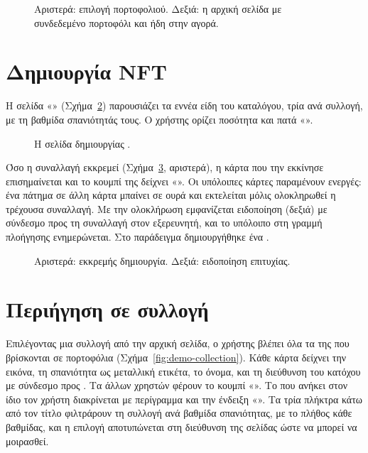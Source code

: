 \begin{figure}[H]
\centering
{}
\caption{Αριστερά: επιλογή πορτοφολιού. Δεξιά: η αρχική σελίδα με συνδεδεμένο πορτοφόλι
και  ήδη στην αγορά.}
\label{fig:demo-connect}
\end{figure}

\section{Δημιουργία NFT}
\label{sec:demo-mint}

Η σελίδα «» (Σχήμα~\ref{fig:demo-mint}) παρουσιάζει τα εννέα είδη του καταλόγου,
τρία ανά συλλογή, με τη βαθμίδα σπανιότητάς τους. Ο χρήστης ορίζει ποσότητα και πατά
«».

\begin{figure}[H]
\centering
{}
\caption{Η σελίδα δημιουργίας .}
\label{fig:demo-mint}
\end{figure}

Όσο η συναλλαγή εκκρεμεί (Σχήμα~\ref{fig:demo-mint-states}, αριστερά), η κάρτα που την
εκκίνησε επισημαίνεται και το κουμπί της δείχνει «». Οι υπόλοιπες κάρτες
παραμένουν ενεργές: ένα πάτημα σε άλλη κάρτα μπαίνει σε ουρά και εκτελείται μόλις
ολοκληρωθεί η τρέχουσα συναλλαγή. Με την ολοκλήρωση εμφανίζεται ειδοποίηση (δεξιά) με
σύνδεσμο προς τη συναλλαγή στον εξερευνητή, και το υπόλοιπο στη γραμμή πλοήγησης
ενημερώνεται. Στο παράδειγμα δημιουργήθηκε ένα .

\begin{figure}[H]
\centering
{}
\caption{Αριστερά: εκκρεμής δημιουργία. Δεξιά: ειδοποίηση επιτυχίας.}
\label{fig:demo-mint-states}
\end{figure}

\section{Περιήγηση σε συλλογή}
\label{sec:demo-collection}

Επιλέγοντας μια συλλογή από την αρχική σελίδα, ο χρήστης βλέπει όλα τα  της που
βρίσκονται σε πορτοφόλια (Σχήμα~\ref{fig:demo-collection}). Κάθε κάρτα δείχνει την εικόνα,
τη σπανιότητα ως μεταλλική ετικέτα, το όνομα, και τη διεύθυνση του κατόχου με σύνδεσμο προς
. Τα  άλλων χρηστών φέρουν το κουμπί «». Το 
που ανήκει στον ίδιο τον χρήστη διακρίνεται με περίγραμμα και την ένδειξη
«». Τα τρία πλήκτρα κάτω από τον τίτλο φιλτράρουν τη συλλογή ανά
βαθμίδα σπανιότητας, με το πλήθος κάθε βαθμίδας, και η επιλογή αποτυπώνεται στη διεύθυνση
της σελίδας ώστε να μπορεί να μοιρασθεί.

